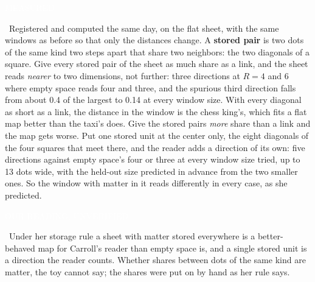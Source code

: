 \documentclass[11pt,letterpaper]{article}
\newcommand{\tagbox}[2]{{\sffamily\scriptsize\colorbox{#1}{\textcolor{white}{\strut #2}}}}
\newcommand{\Meas}{\tagbox{kMeas}{MEASURED}}
\newcommand{\Ours}{\tagbox{kOurs}{OUR READING, UNVERIFIED}}
\begin{document}
\Meas\ Registered and computed the same day, on the flat sheet, with the same windows as before so that only
the distances change. A \textbf{stored pair} is two dots of the same kind two steps apart that share two
neighbors: the two diagonals of a square. Give every stored pair of the sheet as much share as a link, and the
sheet reads \emph{nearer} to two dimensions, not further: three directions at $R = 4$ and $6$ where empty space
reads four and three, and the spurious third direction falls from about 0.4 of the largest to 0.14 at every
window size. With every diagonal as short as a link, the distance in the window is the chess king's, which fits
a flat map better than the taxi's does. Give the stored pairs \emph{more} share than a link and the map gets
worse. Put one stored unit at the center only, the eight diagonals of the four squares that meet there, and the
reader adds a direction of its own: five directions against empty space's four or three at every window size
tried, up to 13 dots wide, with the held-out size predicted in advance from the two smaller ones. So the window
with matter in it reads differently in every case, as she predicted.

\Ours\ Under her storage rule a sheet with matter stored everywhere is a better-behaved map for Carroll's
reader than empty space is, and a single stored unit is a direction the reader counts. Whether shares between
dots of the same kind are matter, the toy cannot say; the shares were put on by hand as her rule says.
\end{document}
